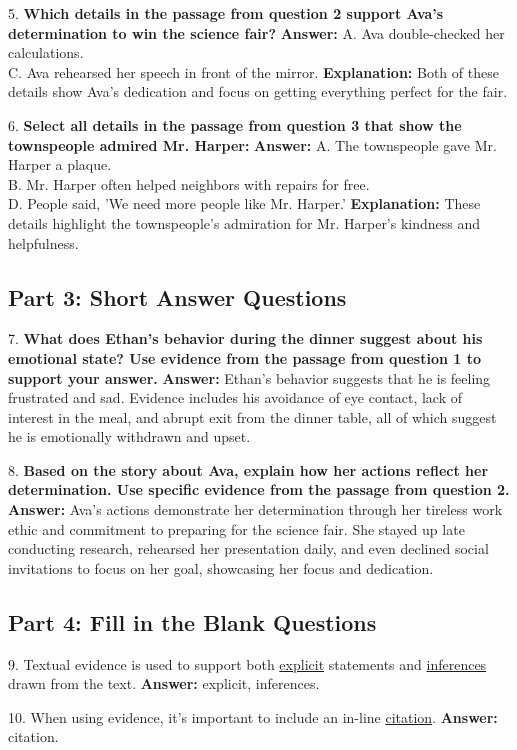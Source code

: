 \documentclass[12pt]{article}
\begin{document}
\vspace{1cm}
5. \textbf{Which details in the passage from question 2 support Ava’s determination to win the science fair?}  
\textbf{Answer:} A. Ava double-checked her calculations. \\
C. Ava rehearsed her speech in front of the mirror.  
\textbf{Explanation:} Both of these details show Ava's dedication and focus on getting everything perfect for the fair.

\vspace{1cm}
6. \textbf{Select all details in the passage from question 3 that show the townspeople admired Mr. Harper:}  
\textbf{Answer:} A. The townspeople gave Mr. Harper a plaque. \\
B. Mr. Harper often helped neighbors with repairs for free. \\
D. People said, 'We need more people like Mr. Harper.'  
\textbf{Explanation:} These details highlight the townspeople's admiration for Mr. Harper’s kindness and helpfulness.

\subsection*{Part 3: Short Answer Questions}

7. \textbf{What does Ethan’s behavior during the dinner suggest about his emotional state? Use evidence from the passage from question 1 to support your answer.}  
\textbf{Answer:} Ethan’s behavior suggests that he is feeling frustrated and sad. Evidence includes his avoidance of eye contact, lack of interest in the meal, and abrupt exit from the dinner table, all of which suggest he is emotionally withdrawn and upset.

\vspace{1cm}
8. \textbf{Based on the story about Ava, explain how her actions reflect her determination. Use specific evidence from the passage from question 2.}  
\textbf{Answer:} Ava’s actions demonstrate her determination through her tireless work ethic and commitment to preparing for the science fair. She stayed up late conducting research, rehearsed her presentation daily, and even declined social invitations to focus on her goal, showcasing her focus and dedication.

\subsection*{Part 4: Fill in the Blank Questions}

9. Textual evidence is used to support both \underline{explicit} statements and \underline{inferences} drawn from the text.  
\textbf{Answer:} explicit, inferences.

10. When using evidence, it's important to include an in-line \underline{citation}.  
\textbf{Answer:} citation.
\end{document}
